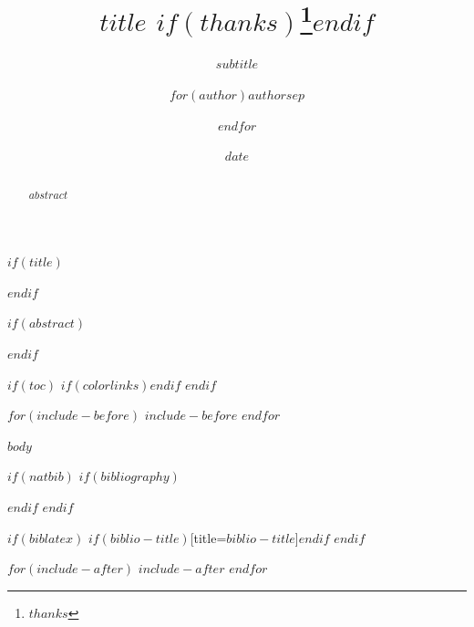 \documentclass[$if(fontsize)$$fontsize$$else$10pt$endif$,$if(papersize)$$papersize$paper$else$a4paper$endif$$for(classoption)$,$classoption$$endfor$]{article}
\title{%
  \vspace{-1em}%
  \LARGE\bfseries $title$%
  $if(thanks)$\thanks{$thanks$}$endif$
}
\subtitle{$subtitle$}
\author{$for(author)$$author$$sep$ \and $endfor$}
\date{$date$}
\begin{document}
$if(title)$
\maketitle
\thispagestyle{plain}   %
$endif$

$if(abstract)$
\begin{abstract}
$abstract$
\end{abstract}
$endif$

$if(toc)$
{$if(colorlinks)$\hypersetup{linkcolor=$if(toccolor)$$toccolor$$else$$endif$}$endif$
\setcounter{tocdepth}{$if(toc-depth)$$toc-depth$$else$3$endif$}
\tableofcontents
}
$endif$

$for(include-before)$
$include-before$
$endfor$

$body$

$if(natbib)$
$if(bibliography)$

$endif$
$endif$

$if(biblatex)$
\printbibliography$if(biblio-title)$[title=$biblio-title$]$endif$
$endif$

$for(include-after)$
$include-after$
$endfor$
\end{document}

